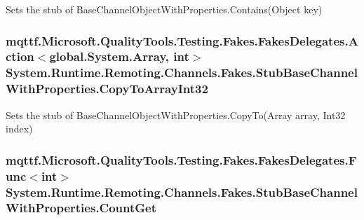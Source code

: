 Sets the stub of Base\-Channel\-Object\-With\-Properties.\-Contains(\-Object key)

\hypertarget{class_system_1_1_runtime_1_1_remoting_1_1_channels_1_1_fakes_1_1_stub_base_channel_with_properties_a8bd0d8504b7df4c4f15d2d6bb1bb6cb8}{
\subsubsection[{Copy\-To\-Array\-Int32}]{\setlength{\rightskip}{0pt plus 5cm}mqttf.\-Microsoft.\-Quality\-Tools.\-Testing.\-Fakes.\-Fakes\-Delegates.\-Action$<$global.\-System.\-Array, int$>$ System.\-Runtime.\-Remoting.\-Channels.\-Fakes.\-Stub\-Base\-Channel\-With\-Properties.\-Copy\-To\-Array\-Int32}}\label{class_system_1_1_runtime_1_1_remoting_1_1_channels_1_1_fakes_1_1_stub_base_channel_with_properties_a8bd0d8504b7df4c4f15d2d6bb1bb6cb8}


Sets the stub of Base\-Channel\-Object\-With\-Properties.\-Copy\-To(\-Array array, Int32 index)

\hypertarget{class_system_1_1_runtime_1_1_remoting_1_1_channels_1_1_fakes_1_1_stub_base_channel_with_properties_a3cdcbf9647d32ecf794ce4c62f9aba22}{
\subsubsection[{Count\-Get}]{\setlength{\rightskip}{0pt plus 5cm}mqttf.\-Microsoft.\-Quality\-Tools.\-Testing.\-Fakes.\-Fakes\-Delegates.\-Func$<$int$>$ System.\-Runtime.\-Remoting.\-Channels.\-Fakes.\-Stub\-Base\-Channel\-With\-Properties.\-Count\-Get}}\label{class_system_1_1_runtime_1_1_remoting_1_1_channels_1_1_fakes_1_1_stub_base_channel_with_properties_a3cdcbf9647d32ecf794ce4c62f9aba22}


